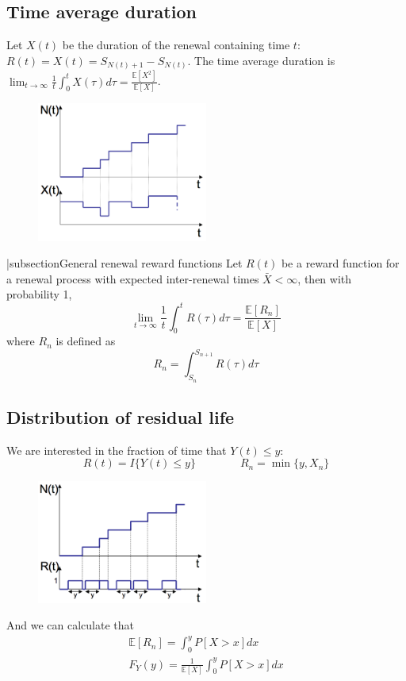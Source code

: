 \documentclass[12pt, openany]{report}
\newcommand{\E}{\mathbb{E}}
\theoremstyle{definition}
\begin{document}
\subsection{Time average duration}
Let $X(t)$ be the duration of the renewal containing time $t$: $R(t)=X(t)=S_{N(t)+1}-S_{N(t)}$. The time average duration is $\lim_{t\to \infty} \frac{1}{t}\int_0^t X(\tau)d\tau = \frac{\E[X^2]}{\E[X]}$.\\
\begin{figure}[H]
	\centering
	\includegraphics[width=0.5\textwidth]{img/duration.png}
\end{figure}
|subsection{General renewal reward functions}
Let $R(t)$ be a reward function for a renewal process with expected inter-renewal times $\bar X<\infty$, then with probability 1, 
\begin{equation}
	\lim_{t\to \infty} \frac{1}{t}\int_0^t R(\tau)d\tau = \frac{\E[R_n]}{\E[X]}
\end{equation}
where $R_n$ is defined as 
\begin{equation}
	R_n = \int_{S_n}^{S_{n+1}} R(\tau)d\tau
\end{equation}
\subsection{Distribution of residual life}
We are interested in the fraction of time that $Y(t)\le y$: 
\begin{equation}
	R(t)= I\{Y(t)\le y\} \qquad \qquad R_n = \min\{y, X_n\}
\end{equation}
\begin{figure}[H]
	\centering
	\includegraphics[width=0.5\textwidth]{img/residual.png}
\end{figure}
And we can calculate that 
\begin{equation}
	\begin{aligned}
		\E[R_n]= \int_0^y P[X>x]dx \\
		F_Y(y) = \frac{1}{\E[X]}\int_0^y P[X>x]dx
	\end{aligned}
\end{equation}
\end{document}

